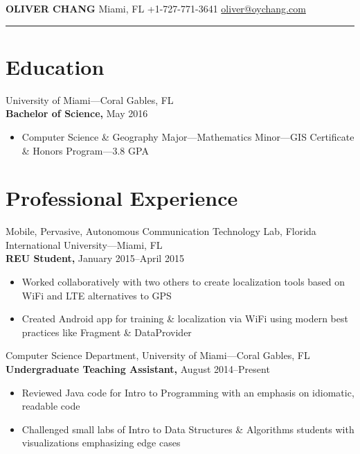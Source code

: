 \documentclass[letterpaper,12pt]{article}
\def\name{Oliver Chang}
\begin{document}
{\centering
  \Huge
    \textbf{\MakeUppercase{\name}}
  \normalsize
    \null\hfill%
      Miami, FL \hfill
      +1-727-771-3641 \hfill
      \href{mailto:oliver@oychang.com}{oliver@oychang.com}
    \hfill\null\\
}

\vskip 3mm
\hrule
\vskip 5mm

\section*{Education}
University of Miami---Coral Gables, FL\\
\textbf{Bachelor of Science,} May 2016
\begin{itemize}
    \item Computer Science \& Geography Major---Mathematics Minor---GIS Certificate \& Honors Program---3.8 GPA
\end{itemize}

\vskip 2.5mm

\section*{Professional Experience}

Mobile, Pervasive, Autonomous Communication Technology Lab, Florida International University---Miami, FL\\
\textbf{REU Student,} January 2015--April 2015
\begin{itemize}
  \item Worked collaboratively with two others to create localization tools based on WiFi and LTE alternatives to GPS
  \item Created Android app for training \& localization via WiFi using modern best practices like Fragment \& DataProvider
\end{itemize}

Computer Science Department, University of Miami---Coral Gables, FL\\
\textbf{Undergraduate Teaching Assistant,} August 2014--Present
\begin{itemize}
  \item Reviewed Java code for Intro to Programming with an emphasis on idiomatic, readable code
  \item Challenged small labs of Intro to Data Structures \& Algorithms students with visualizations emphasizing edge cases
\end{itemize}
\end{document}
